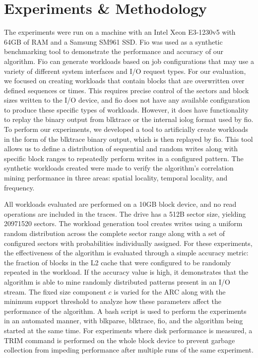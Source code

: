 \documentclass[MEng]{uofl}
\begin{document}
\chapter{Experiments \& Methodology}
The experiments were run on a machine with an Intel Xeon E3-1230v5 with 64GB of RAM and a Samsung SM961 SSD. Fio was used as a synthetic benchmarking tool to demonstrate the performance and accuracy of our algorithm. Fio can generate workloads based on job configurations that may use a variety of different system interfaces and I/O request types. For our evaluation, we focused on creating workloads that contain blocks that are overwritten over defined sequences or times. This requires precise control of the sectors and block sizes written to the I/O device, and fio does not have any available configuration to produce these specific types of workloads. However, it does have functionality to replay the binary output from blktrace or the internal iolog format used by fio. To perform our experiments, we developed a tool to artificially create workloads in the form of the blktrace binary output, which is then replayed by fio. This tool allows us to define a distribution of sequential and random writes along with specific block ranges to repeatedly perform writes in a configured pattern. The synthetic workloads created were made to verify the algorithm’s correlation mining performance in three areas: spatial locality, temporal locality, and frequency. 

All workloads evaluated are performed on a 10GB block device, and no read operations are included in the traces. The drive has a 512B sector size, yielding 20971520 sectors. The workload generation tool creates writes using a uniform random distribution across the complete sector range along with a set of configured sectors with probabilities individually assigned. For these experiments, the effectiveness of the algorithm is evaluated through a simple accuracy metric: the fraction of blocks in the L2 cache that were configured to be randomly repeated in the workload. If the accuracy value is high, it demonstrates that the algorithm is able to mine randomly distributed patterns present in an I/O stream. The fixed size component $c$ is varied for the ARC along with the minimum support threshold to analyze how these parameters affect the performance of the algorithm. A bash script is used to perform the experiments in an automated manner, with blkparse, blktrace, fio, and the algorithm being started at the same time. For experiments where disk performance is measured, a TRIM command is performed on the whole block device to prevent garbage collection from impeding performance after multiple runs of the same experiment.
\end{document}
